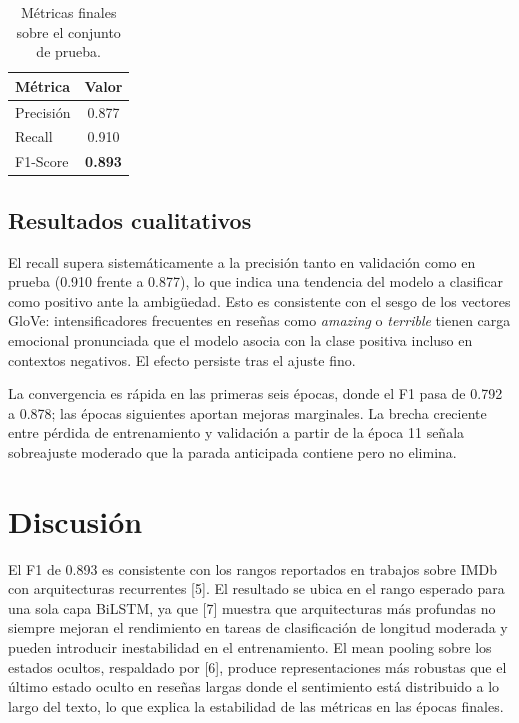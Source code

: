 \documentclass[letterpaper, 10pt, conference]{ieeeconf}
\begin{document}
\begin{table}[h]
\centering
\caption{M\'etricas finales sobre el conjunto de prueba.}
\label{tab:prueba}
\begin{tabular}{lc}
\toprule
\textbf{M\'etrica} & \textbf{Valor} \\
\midrule
Precisi\'on  & 0.877 \\
Recall       & 0.910 \\
F1-Score     & \textbf{0.893} \\
\bottomrule
\end{tabular}
\end{table}

\subsection{Resultados cualitativos}

El recall supera sistem\'aticamente a la precisi\'on tanto en validaci\'on como
en prueba (0.910 frente a 0.877), lo que indica una tendencia del modelo a
clasificar como positivo ante la ambig\"uedad. Esto es consistente con el sesgo
de los vectores GloVe: intensificadores frecuentes en rese\~nas como
\textit{amazing} o \textit{terrible} tienen carga emocional pronunciada que el
modelo asocia con la clase positiva incluso en contextos negativos. El efecto
persiste tras el ajuste fino.

La convergencia es r\'apida en las primeras seis \'epocas, donde el F1 pasa
de 0.792 a 0.878; las \'epocas siguientes aportan mejoras marginales. La
brecha creciente entre p\'erdida de entrenamiento y validaci\'on a partir de
la \'epoca 11 se\~nala sobreajuste moderado que la parada anticipada contiene
pero no elimina.

\section{Discusi\'on}

El F1 de 0.893 es consistente con los rangos reportados en trabajos sobre IMDb
con arquitecturas recurrentes [5]. El resultado se ubica en el rango esperado
para una sola capa BiLSTM, ya que [7] muestra que arquitecturas m\'as profundas
no siempre mejoran el rendimiento en tareas de clasificaci\'on de longitud
moderada y pueden introducir inestabilidad en el entrenamiento. El mean pooling
sobre los estados ocultos, respaldado por [6], produce representaciones m\'as
robustas que el \'ultimo estado oculto en rese\~nas largas donde el sentimiento
est\'a distribuido a lo largo del texto, lo que explica la estabilidad de las
m\'etricas en las \'epocas finales.
\end{document}
